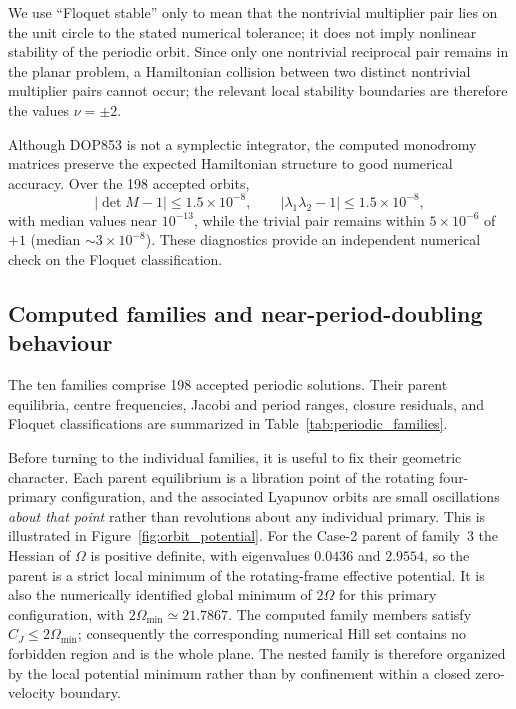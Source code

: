 We use ``Floquet stable'' only to mean that the nontrivial multiplier pair
lies on the unit circle to the stated numerical tolerance; it does not
imply nonlinear stability of the periodic orbit. Since only one
nontrivial reciprocal pair remains in the planar problem, a Hamiltonian
collision between two distinct nontrivial multiplier pairs cannot occur;
the relevant local stability boundaries are therefore the values
$\nu=\pm2$.

Although DOP853 is not a symplectic integrator, the computed monodromy
matrices preserve the expected Hamiltonian structure to good numerical
accuracy. Over the 198 accepted orbits,
\[
|\det M-1|\leq1.5\times10^{-8},
\qquad
|\lambda_1\lambda_2-1|\leq1.5\times10^{-8},
\]
with median values near $10^{-13}$, while the trivial pair remains within
$5\times10^{-6}$ of $+1$ (median $\sim3\times10^{-8}$). These diagnostics
provide an independent numerical check on the Floquet classification.


\subsection{Computed families and near-period-doubling behaviour}
\label{subsec:periodic_results}

The ten families comprise 198 accepted periodic solutions. Their parent
equilibria, centre frequencies, Jacobi and period ranges, closure residuals,
and Floquet classifications are summarized in
Table~\ref{tab:periodic_families}.

Before turning to the individual families, it is useful to fix their
geometric character. Each parent equilibrium is a libration point of the
rotating four-primary configuration, and the associated Lyapunov orbits are
small oscillations \emph{about that point} rather than revolutions about any
individual primary. This is illustrated in Figure~\ref{fig:orbit_potential}.
For the Case-2 parent of family~3 the Hessian of $\Omega$ is positive
definite, with eigenvalues $0.0436$ and $2.9554$, so the parent is a strict
local minimum of the rotating-frame effective potential. It is also the
numerically identified global minimum of $2\Omega$ for this primary
configuration, with $2\Omega_{\min}\simeq21.7867$. The computed family
members satisfy $C_J\le2\Omega_{\min}$; consequently the corresponding
numerical Hill set contains no forbidden region and is the whole plane. The
nested family is therefore organized by the local potential minimum rather
than by confinement within a closed zero-velocity boundary.

